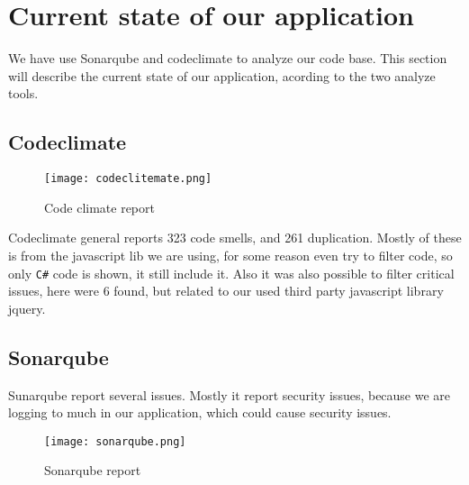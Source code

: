 \section{Current state of our application}

We have use Sonarqube and codeclimate to analyze our code base. This section will describe the current state of our application, acording to the two analyze tools.

\subsection*{Codeclimate}

\begin{figure}[H]
	\centering
	\texttt{[image: codeclitemate.png]}
	\caption{Code climate report}
	\label{fig:Code climate}
\end{figure}

Codeclimate general reports 323 code smells, and 261 duplication. Mostly of these is from the javascript lib we are using, for some reason even try to filter code, so only \texttt{C\#} code is shown, it still include it. Also it was also possible to filter critical issues, here were 6 found, but related to our used third party javascript library jquery. %

\subsection*{Sonarqube}
Sunarqube report several issues. Mostly it report security issues, because we are logging to much in our application, which could cause security issues.
\begin{figure}[H]
	\centering
	\texttt{[image: sonarqube.png]}
	\caption{Sonarqube report}
	\label{fig:Sonarqube}
\end{figure}
